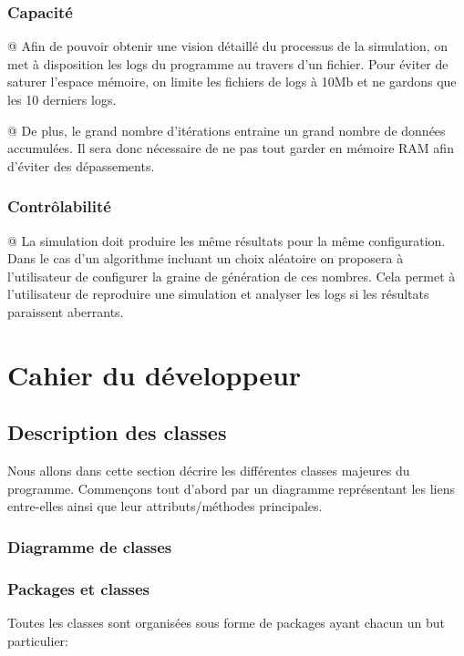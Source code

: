 \documentclass[final]{polytech/polytech}
\begin{document}
		\subsection{Capacité}
			\begin{easylist}
				@ Afin de pouvoir obtenir une vision détaillé du processus de la simulation, on met à disposition les logs du programme au travers d'un fichier.
				Pour éviter de saturer l'espace mémoire, on limite les fichiers de logs à 10Mb et ne gardons que les 10 derniers logs.
			
				@ De plus, le grand nombre d'itérations entraine un grand nombre de données accumulées.
				Il sera donc nécessaire de ne pas tout garder en mémoire RAM afin d'éviter des dépassements.
			\end{easylist}

		\subsection{Contrôlabilité}
			\begin{easylist}
				@ La simulation doit produire les même résultats pour la même configuration.
				Dans le cas d'un algorithme incluant un choix aléatoire on proposera à l'utilisateur de configurer la graine de génération de ces nombres.
				Cela permet à l'utilisateur de reproduire une simulation et analyser les logs si les résultats paraissent aberrants.
			\end{easylist}
					
\chapter{Cahier du développeur}
	\section{Description des classes}
		Nous allons dans cette section décrire les différentes classes majeures du programme.
		Commençons tout d'abord par un diagramme représentant les liens entre-elles ainsi que leur attributs/méthodes principales.
		
		\subsection{Diagramme de classes\label{sec:classes}}
			
		\subsection{Packages et classes}
			Toutes les classes sont organisées sous forme de packages ayant chacun un but particulier:
			
\end{document}
